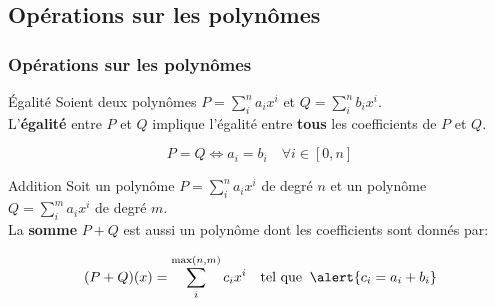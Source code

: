 \documentclass{beamer}
\begin{document}
\subsection{Opérations sur les polynômes}%
\begin{frame}[t]
  \frametitle{Opérations sur les polynômes}

  \begin{block}{Égalité}
    \small
    Soient deux polynômes $P=\sum_{i}^na_i x^i$ et $Q=\sum_i^n b_ix^i$.\\[4pt]
    L'\textbf{\alert{égalité}}
  entre $P$ et $Q$ implique l'égalité entre \textbf{\alert{tous}} les
  coefficients de  $P$ et $Q$.

  \begin{equation}
    P = Q \iff a_i = b_i\quad \forall i \in [0, n]
  \end{equation}
  \end{block}
\pause 
  \begin{block}{Addition}
    \small
    Soit un polynôme $P=\sum_i ^n a_i x^i$ de degré $n$ et un polynôme
    $Q=\sum_i^m a_i x^i$ de degré $m$.\\[4pt]

    La \alert{\textbf{somme}}  $P+Q$ est aussi un polynôme dont les coefficients
    sont donnés par: 

    \begin{equation}
      (P+Q)(x) = \sum_i^{\max(n,m)} c_i x^i\quad \text{tel que}\;\; \alert{c_i =
      a_i +b_i}
    \end{equation}
  \end{block}
\end{frame}
\end{document}
